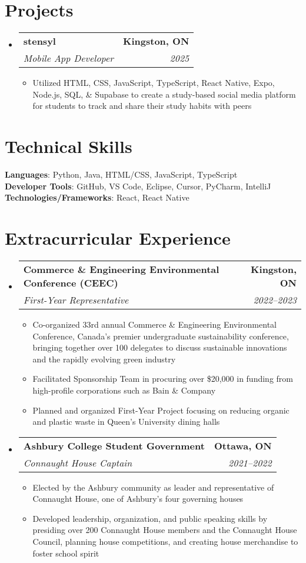 \documentclass[letterpaper,10pt]{article}
\makeatletter
\newcommand{\resumeItem}[1]{
  \item\small{
    {#1 \vspace{-2pt}}
  }
}
\newcommand{\resumeSubheading}[4]{
  \vspace{-2pt}\item
    \begin{tabular*}{1.0\textwidth}[t]{l@{\extracolsep{\fill}}r}
      \textbf{#1} & \textbf{\small #2} \\
      \textit{\small#3} & \textit{\small #4} \\
    \end{tabular*}\vspace{-7pt}
}
\newcommand{\resumeSubHeadingListStart}{\begin{itemize}[leftmargin=0.0in, label={}]}
\newcommand{\resumeSubHeadingListEnd}{\end{itemize}}
\newcommand{\resumeItemListStart}{\begin{itemize}[label=--]}
\newcommand{\resumeItemListEnd}{\end{itemize}\vspace{-5pt}}
\makeatother
\begin{document}
\section{Projects}
    \resumeSubHeadingListStart
      \resumeSubheading
          {stensyl}{Kingston, ON}
          {Mobile App Developer}{2025}
          \resumeItemListStart
            \resumeItem{Utilized HTML, CSS, JavaScript, TypeScript, React Native, Expo, Node.js, SQL, \& Supabase to create a study-based social media platform for students to track and share their study habits with peers}
          \resumeItemListEnd
    \resumeSubHeadingListEnd

%
\section{Technical Skills}
 \begin{itemize}[leftmargin=0.15in, label={}]
    \small{\item{
     \textbf{Languages}{: Python, Java, HTML/CSS, JavaScript, TypeScript} \\
     \textbf{Developer Tools}{: GitHub, VS Code, Eclipse, Cursor, PyCharm, IntelliJ} \\
     \textbf{Technologies/Frameworks}{: React, React Native} \\
    }}
 \end{itemize}
 \vspace{-16pt}

\section{Extracurricular Experience}
    \resumeSubHeadingListStart
      \resumeSubheading
        {Commerce \& Engineering Environmental Conference (CEEC)}{Kingston, ON}
        {First-Year Representative}{2022--2023}
        \resumeItemListStart
            \resumeItem{Co-organized 33rd annual Commerce \& Engineering Environmental Conference, Canada's premier undergraduate sustainability conference, bringing together over 100 delegates to discuss sustainable innovations and the rapidly evolving green industry}
            \resumeItem{Facilitated Sponsorship Team in procuring over \$20,000 in funding from high-profile corporations such as Bain \& Company}
            \resumeItem{Planned and organized First-Year Project focusing on reducing organic and plastic waste in Queen's University dining halls}
        \resumeItemListEnd
      \resumeSubheading
        {Ashbury College Student Government}{Ottawa, ON}
        {Connaught House Captain}{2021--2022}
        \resumeItemListStart
            \resumeItem{Elected by the Ashbury community as leader and representative of Connaught House, one of Ashbury's four governing houses}
            \resumeItem{Developed leadership, organization, and public speaking skills by presiding over 200 Connaught House members and the Connaught House Council, planning house competitions, and creating house merchandise to foster school spirit}
        \resumeItemListEnd
    \resumeSubHeadingListEnd
\end{document}
